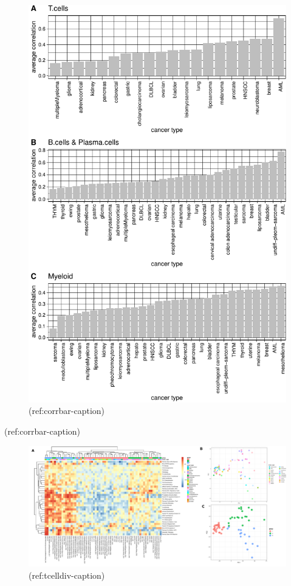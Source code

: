 \documentclass[12pt,]{book}
\theoremstyle{definition}
\theoremstyle{definition}
\theoremstyle{definition}
\theoremstyle{remark}
\begin{document}
\begin{figure}

{\centering \includegraphics{UCzPhDThesis_files/figure-latex/corrbar-1} 

}

\caption[Correlation of cell-type metagenes with the refrence profiles]{(ref:corrbar-caption)}\label{fig:corrbar}
\end{figure}

(ref:corrbar-caption)

\begin{figure}

{\centering \includegraphics[width=7.5in,angle=90]{figures-ext/TcellDiv} 

}

\caption[Analysis of T cell diversity]{(ref:tcelldiv-caption)}\label{fig:tcelldiv}
\end{figure}
\end{document}
